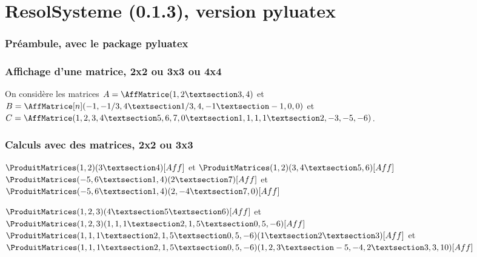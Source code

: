 \documentclass[french,a4paper,10pt]{article}
\def\RSver{0.1.3}
\begin{document}
\part*{ResolSysteme (\RSver), version \og pyluatex \fg{}}

\section{Préambule, avec le package pyluatex}


\section{Affichage d'une matrice, 2x2 ou 3x3 ou 4x4}

\begin{ShowCodeTeX}
On considère les matrices $A=\AffMatrice(1,2 § 3,4)$
et $B=\AffMatrice[n](-1,-1/3,4 § 1/3,4,-1 § -1,0,0)$
et $C=\AffMatrice(1,2,3,4 § 5,6,7,0 § 1,1,1,1 § 2,-3,-5,-6)$.
\end{ShowCodeTeX}

\section{Calculs avec des matrices, 2x2 ou 3x3}

\begin{ShowCodeTeX}
$\ProduitMatrices(1,2)(3 § 4)[Aff]$ et $\ProduitMatrices(1,2)(3,4 § 5,6)[Aff]$ \\
$\ProduitMatrices(-5,6 § 1,4)(2 § 7)[Aff]$ et $\ProduitMatrices(-5,6 § 1,4)(2,-4 § 7,0)[Aff]$
\end{ShowCodeTeX}

\begin{ShowCodeTeX}
$\ProduitMatrices(1,2,3)(4 § 5 § 6)[Aff]$ et $\ProduitMatrices(1,2,3)(1,1,1 § 2,1,5 § 0,5,-6)[Aff]$\\
$\ProduitMatrices(1,1,1 § 2,1,5 § 0,5,-6)(1 § 2 § 3)[Aff]$ et
$\ProduitMatrices(1,1,1 § 2,1,5 § 0,5,-6)(1,2,3 § -5,-4,2 § 3,3,10)[Aff]$
\end{ShowCodeTeX}
\end{document}
